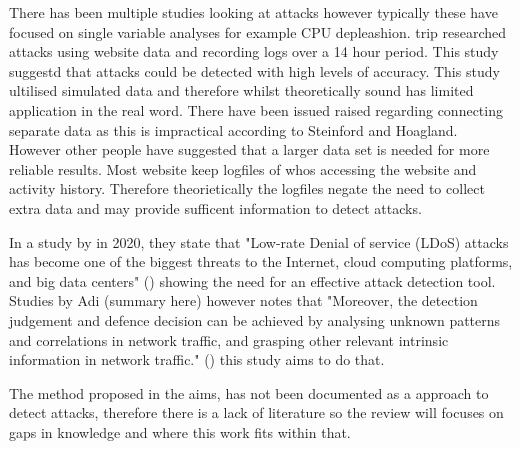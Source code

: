 
There has been multiple studies looking at attacks however typically these have focused on single variable analyses for example CPU depleashion. trip researched attacks using website data and recording logs over a 14 hour period. This study suggestd that attacks could be detected with high levels of accuracy. This study ultilised simulated data and therefore whilst theoretically sound  has limited application in the real word. There have been issued raised regarding connecting separate data as this is impractical according to Steinford and Hoagland. However other people have suggested that a larger data set is needed for more reliable results. Most website keep logfiles of whos accessing the website and activity history. Therefore theorietically the logfiles negate the need to collect extra data and may provide sufficent information to detect attacks. 

In a study by \citeauthor{9016229} in 2020, they state that "Low-rate Denial of service (LDoS) attacks has become one of the biggest threats to the Internet, cloud computing platforms, and big data centers" (\cite{9016229}) showing the need for an effective attack detection tool. Studies by Adi (summary here) however \citeauthor{9016229} notes that "Moreover, the detection judgement and defence decision can be achieved by analysing unknown patterns and correlations in network traffic, and grasping other relevant intrinsic information in network traffic."  (\cite{9016229}) this study aims to do that.


The method proposed in the aims, has not been documented as a approach to detect attacks, therefore there is a lack of literature so the review will focuses on gaps in knowledge and where this work fits within that.


